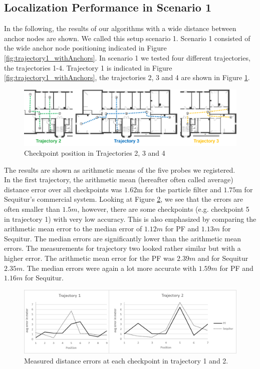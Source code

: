 \subsection{Localization Performance in Scenario 1}
In the following, the results of our algorithms with a wide distance between anchor nodes are shown. We called this setup scenario 1. Scenario 1 consisted of the wide anchor node positioning indicated in Figure \ref{fig:trajectory1_withAnchors}. In scenario 1 we tested four different trajectories, the trajectories 1-4. Trajectory 1 is indicated in Figure \ref{fig:trajectory1_withAnchors}, the trajectories 2, 3 and 4 are shown in Figure \ref{fig:trajectories2to4}.
\begin{figure}[th]
\centering
\includegraphics[width=1.0\textwidth]{Figures/trajectories2to4}
\decoRule
\caption[Trajectories 2-4]{Checkpoint position in Trajectories 2, 3 and 4}
\label{fig:trajectories2to4}
\end{figure}
The results are shown as arithmetic means of the five probes we registered.\\
\noindent\hspace*{5mm}%
In the first trajectory, the arithmetic mean (hereafter often called average) distance error over all checkpoints was $1.62$m for the particle filter and $1.75$m for Sequitur's commercial system. Looking at Figure \ref{fig:trajectory1and2_results}, we see that the errors are often smaller than $1.5m$, however, there are some checkpoints (e.g. checkpoint 5 in trajectory 1) with very low accuracy. This is also emphasized by comparing the arithmetic mean error to the median error of $1.12m$ for PF and $1.13m$ for Sequitur. The median errors are significantly lower than the arithmetic mean errors. The measurements for trajectory two looked rather similar but with a higher error. The arithmetic mean error for the PF was $2.39m$ and for Sequitur $2.35m$. The median errors were again a lot more accurate with $1.59m$ for PF and $1.16m$ for Sequitur.
\begin{figure}[th]
\centering
\includegraphics[width=1.0\textwidth]{Figures/trajectory1_2_results}
\decoRule
\caption[Localization Results of Trajectory 1 and 2]{Measured distance errors at each checkpoint in trajectory 1 and 2.}
\label{fig:trajectory1and2_results}
\end{figure}

